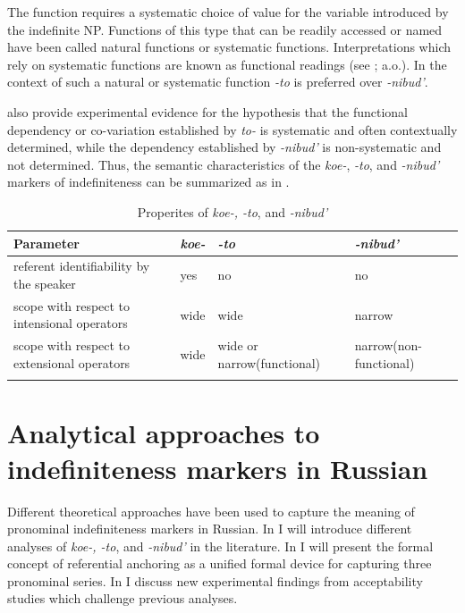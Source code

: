 \documentclass[output=paper,colorlinks,citecolor=brown]{langscibook}
\begin{document}
The function requires a systematic choice of value for the variable introduced by the indefinite NP. Functions of this type that can be readily accessed or named have been called natural functions \citep[212]{Chierchia1993} or systematic functions. Interpretations which rely on systematic functions are known as functional readings (see \citealt{Kratzer1998,Schwarzschild2002a}; a.o.). In the context of such a natural or systematic function \textit{-to} is preferred over \textit{-nibud’}.

\citet{Onea.Geist2011} also provide experimental evidence for the hypothesis that the functional dependency or co-variation established by \textit{to-} is systematic and often contextually determined, while the dependency established by \textit{-nibud’} is non-systematic and not determined. Thus, the semantic characteristics of the \textit{koe-}, \textit{-to}, and \textit{-nibud’} markers of indefiniteness can be summarized as in .

\begin{table}
    \centering
    \begin{tabularx}{.95\textwidth}{p{3.45cm}p{1.55cm}@{~~}X@{~~}X}
    \lsptoprule
         Parameter&\textit{koe-}&\textit{-to}&\textit{-nibud'}\\\midrule
         referent identifiability by the speaker\medskip&yes&no&no\\
         scope with respect to intensional operators\medskip&wide&wide&narrow\\
         scope with respect to extensional operators&wide&wide or narrow\newline (functional)&narrow\newline (non-functional)\\
    \lspbottomrule
    \end{tabularx}
    \caption{Properites of \textit{koe-, -to}, and \textit{-nibud’}}
    \label{geist:tab:scope-koe-to-nibud}
\end{table}

\section{Analytical approaches to indefiniteness markers in Russian}\label{geist:sec:3}

Different theoretical approaches have been used to capture the meaning of pro\-nominal indefiniteness markers in Russian. In  I will introduce different analyses of \textit{koe-, -to}, and \textit{-nibud’} in the literature. In  I will present the formal concept of referential anchoring as a unified formal device for capturing three pronominal series. In  I discuss new experimental findings from acceptability studies which challenge previous analyses.
\end{document}
